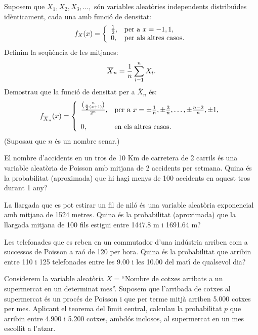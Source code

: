 \begin{prob}
{Suposem que $X_1,X_2,X_3,\ldots,$ s\'on variables aleat\`ories
independents distribu\"{\i}des id\`enticament, cada una amb funci\'o de densitat:
$$f_{X}(x)=
\left\{\begin{array}{ll}
{1\over 2}, & \text{per a $x=-1,1$}, \\
0, & \text{per als altres casos.}
\end{array}\right.
$$
Definim la seq\"u\`encia de les mitjanes: $$\overline{X}_n ={1\over n}\sum_{i=1}^n
X_i.$$Demostrau que la funci\'o de densitat per a $\overline{X}_n$ \'es:
$$f_{\overline{X}_n} (x)=
\left\{\begin{array}{ll}
{{n\choose {n\over 2}(x+1)}\over 2^n}, & \text{per a
$x=\pm {1\over n},\pm {3\over n},\ldots,\pm {n-2\over n}, \pm 1$},\\ & \\
0, &
\text{en els altres casos.}
\end{array}\right.
$$(Suposau que $n$ \'es un nombre senar.)}
\end{prob}

\begin{prob}
{El nombre d'accidents en un tros de 10 Km de carretera de 2 carrils
\'es una variable aleat\`oria de Poisson amb mitjana de 2 accidents per setmana.
Quina \'es la probabilitat (aproximada) que hi hagi menys de 100 accidents
en aquest tros durant 1 any?}
\end{prob}

\begin{prob}
{La llargada que es pot estirar un fil de nil\'o \'es una variable aleat\`oria
exponencial amb mitjana de 1524 metres. Quina \'es la probabilitat (aproximada)
que la llargada mitjana de 100 fils estigui entre 1447.8 m i 1691.64 m?}
\end{prob}

\begin{prob}
{Les telefonades que es reben en un commutador
d'una ind\'ustria arriben com a successos de Poisson a ra\'o de 120 per hora. Quina
\'es la probabilitat que arribin entre 110 i 125 telefonades entre les 9.00 i les
10.00 del mat\'{\i} de qualsevol dia?}
\end{prob}

\begin{prob}
{Considerem la variable aleat\`oria $X=$``Nombre de cotxes arribats a un
supermercat en un determinat mes''. Suposem que l'arribada de cotxes al
supermercat \'es un proc\'es de Poisson i que per terme mitj\`a arriben 5.000 cotxes per mes.
Aplicant el teorema del l\'{\i}mit central, calculau la probabilitat $p$ que
arribin entre 4.900 i 5.200 cotxes, ambd\'os inclosos, al supermercat en un mes
escollit a l'atzar.}
\end{prob}

